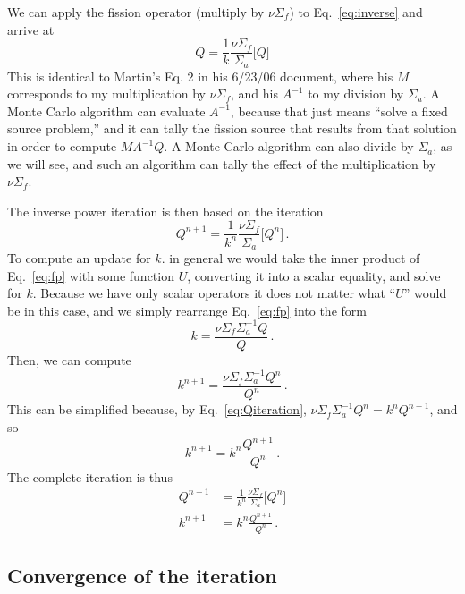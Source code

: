 \documentclass[12pt]{article}
\begin{document}
We can apply the fission operator (multiply by $\nu \Sigma_f$) to Eq.~\ref{eq:inverse} and arrive at
\begin{equation}
Q = \frac{1}{k} \frac{\nu\Sigma_f}{\Sigma_a} \biggl[Q \biggr] \label{eq:fp}
\end{equation}
This is identical to Martin's Eq. 2 in his 6/23/06 document, where his $M$ corresponds to my multiplication by $\nu\Sigma_f$, and his $A^{-1}$ to my division by $\Sigma_a$.  A Monte Carlo algorithm can evaluate $A^{-1}$, because that just means ``solve a fixed source problem,'' and it can tally the fission source that results from that solution in order to compute $MA^{-1}Q$. A Monte Carlo algorithm can also divide by $\Sigma_a$, as we will see, and such an algorithm can tally the effect of the multiplication by $\nu\Sigma_f$.

The inverse power iteration is then based on the iteration
\begin{equation}
Q^{n+1} = \frac{1}{k^n} \frac{\nu\Sigma_f}{\Sigma_a} \biggl[Q^n \biggr] \,.
\label{eq:Qiteration}
\end{equation}
To compute an update for $k$. in general we would take the inner product of Eq.~\ref{eq:fp} with some function $U$, converting it into a scalar equality, and solve for $k$.  Because we have only scalar operators it does not matter what ``$U$'' would be in this case, and we simply rearrange Eq.~\ref{eq:fp} into the form
\begin{equation}
k = \frac{\nu\Sigma_f \Sigma_a^{-1} Q}{Q} \,.
\end{equation} 
Then, we can compute
\begin{equation}
k^{n+1} = \frac{\nu\Sigma_f \Sigma_a^{-1} Q^n}{Q^n} \,.
\end{equation}
This can be simplified because, by Eq.~\ref{eq:Qiteration}, $\nu\Sigma_f \Sigma_a^{-1} Q^n = k^n Q^{n+1}$, and so 
\begin{equation}
k^{n+1} = k^n \frac{Q^{n+1}}{Q^n} \,.
\end{equation}
The complete iteration is thus
\begin{align}
Q^{n+1} &= \frac{1}{k^n} \frac{\nu\Sigma_f}{\Sigma_a} \biggl[Q^n \biggr] \label{eq:Qiter}\\
k^{n+1} &= k^n \frac{Q^{n+1}}{Q^n} \label{eq:kiter} \,.
\end{align}

\subsection{Convergence of the iteration}
\end{document}
